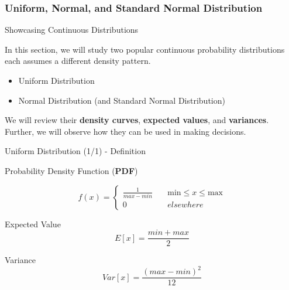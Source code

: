 \documentclass{beamer}
\begin{document}
\subsubsection{Uniform, Normal, and Standard Normal Distribution}

\begin{frame}{Showcasing Continuous Distributions}

In this section, we will study two popular continuous probability distributions each assumes a different density pattern. 

\begin{itemize}
\item Uniform Distribution 
\item Normal Distribution (and Standard Normal Distribution)
\end{itemize}

\vspace{0.3cm}

We will review their \textbf{density curves}, \textbf{expected values}, and \textbf{variances}. Further, we will observe how they can be used in making decisions. 


\end{frame}





\begin{frame}{Uniform Distribution (1/1) - Definition}

Probability Density Function (\textbf{PDF})

$$
f(x) = \left\{
        \begin{array}{ll}
            \frac{1}{max - min} & \quad \text{min} \leq x \leq \text{max} \\
            0 & \quad elsewhere
        \end{array}
    \right.
$$


Expected Value
$$E[x] = \frac{min + max}{2}$$

Variance
$$Var[x] = \frac{(max - min)^2}{12}$$

\end{frame}
\end{document}
